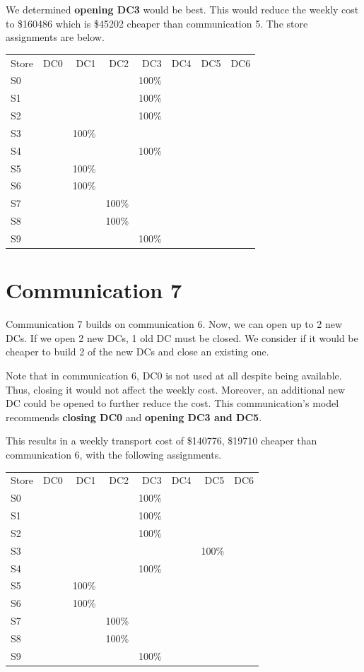 \documentclass[11pt,a4paper]{article}
\begin{document}
We determined \textbf{opening DC3} would be best. This 
 would reduce the weekly cost to 
\$160486 which is \$45202 cheaper than communication 5. 
The store assignments are below. \\[1 em]
\begin{tabular}{l  r  r  r r r r r}
    Store & DC0 & DC1 & DC2 & DC3 & DC4 & DC5 & DC6 \\
    S0 &  &  &  & 100\% &  &  &  \\
    S1 &  &  &  & 100\% &  &  &  \\
    S2 &  &  &  & 100\% &  &  &  \\
    S3 &  & 100\% &  &  &  &  &  \\
    S4 &  &  &  & 100\% &  &  &  \\
    S5 &  & 100\% &  &  &  &  &  \\
    S6 &  & 100\% &  &  &  &  &  \\
    S7 &  &  & 100\% &  &  &  &  \\
    S8 &  &  & 100\% &  &  &  &  \\
    S9 &  &  &  & 100\% &  &  &  \\
\end{tabular}


\section{Communication 7}
Communication 7 builds on communication 6. Now, we can open up to 2 new DCs. 
If we open 2 new DCs, 1 old DC must be closed.
We consider if it would be cheaper
to build 2 of the new DCs and close an existing one.\@  

Note that in communication 6, DC0 is not used at all despite being available. 
Thus, closing it would not affect the weekly cost. Moreover, 
an additional new DC could be opened to further reduce the cost. This 
communication's model recommends \textbf{closing DC0} and 
\textbf{opening DC3 and DC5}. 

This results in a weekly transport cost of \$140776, \$19710 cheaper  than communication 
6, with the following assignments.\\[1em]
\begin{tabular}{l  r  r  r  r r r r}
    Store & DC0 & DC1 & DC2 & DC3 & DC4 & DC5 & DC6 \\
    S0 &  &  &  & 100\% &  &  &  \\
    S1 &  &  &  & 100\% &  &  &  \\
    S2 &  &  &  & 100\% &  &  &  \\
    S3 &  &  &  &  &  & 100\% &  \\
    S4 &  &  &  & 100\% &  &  &  \\
    S5 &  & 100\% &  &  &  &  &  \\
    S6 &  & 100\% &  &  &  &  &  \\
    S7 &  &  & 100\% &  &  &  &  \\
    S8 &  &  & 100\% &  &  &  &  \\
    S9 &  &  &  & 100\% &  &  &  \\
\end{tabular}
\end{document}
